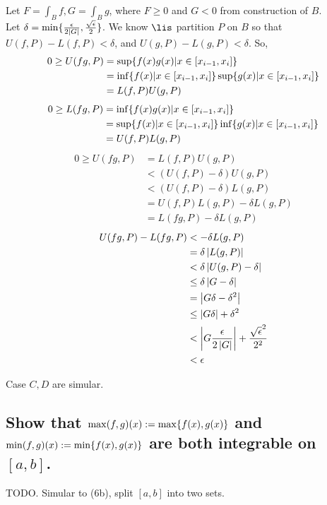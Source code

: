         Let $F = \int_B f, G = \int_B g$,
        where $F \geq 0$ and $G < 0$ from construction of $B$.
        \\
        Let $\delta = \min\{ \frac{\epsilon}{2\left|G\right|}, \frac{\sqrt{\epsilon}}{2} \}$.
        We know $\lis$ partition $P$ on $B$ so that 
        $U(f,P) - L(f,P) < \delta$, and
        $U(g,P) - L(g,P) < \delta$.
        So,
        \begin{align*}
            0 \geq U(fg,P) 
            &= \sup\{ f(x)g(x) | x \in [x_{i-1}, x_i] \}\\
            &= \inf\{ f(x) | x \in [x_{i-1}, x_i] \}
                \sup\{ g(x) | x \in [x_{i-1}, x_i] \}\\
            &= L(f,P)U(g,P)
        \end{align*}
        \begin{align*}
            0 \geq L(fg,P) 
            &= \inf\{ f(x)g(x) | x \in [x_{i-1}, x_i] \}\\
            &=\sup\{ f(x) | x \in [x_{i-1}, x_i] \}
                \inf\{ g(x) | x \in [x_{i-1}, x_i] \}\\
            &= U(f,P)L(g,P)
        \end{align*}
        \begin{align*}
            0 \geq U(fg,P) 
            &= L(f,P)U(g,P) \\
            &< (U(f,P) - \delta) U(g,P) \\
            &< (U(f,P) - \delta) L(g,P) \\
            &= U(f,P)L(g,P) - \delta L(g,P) \\
            &= L(fg,P) - \delta L(g,P) 
        \end{align*}
        \begin{align*}
            U(fg,P) - L(fg,P)
            &< -\delta L(g,P) \\
            &= \delta \left|L(g,P)\right| \\
            &< \delta \left|U(g,P) - \delta\right| \\
            &\leq \delta \left|G - \delta\right| \\
            &= \left|G\delta - \delta^2\right| \\
            &\leq \left|G\delta\right| + \delta^2 \\
            &< \left|G\frac{\epsilon}{2\left|G\right|}\right| + \frac{\sqrt{\epsilon}^2}{2^2}\\
            &< \epsilon
        \end{align*}

        Case $C,D$ are simular.

    \subsection{Show that $\max(f,g)(x) := \max\{ f(x),g(x) \}$
        and $\min(f,g)(x) := \min\{ f(x),g(x) \}$
        are both integrable on $[a,b]$.}

        TODO. 
        Simular to (6b), split $[a,b]$ into two sets.